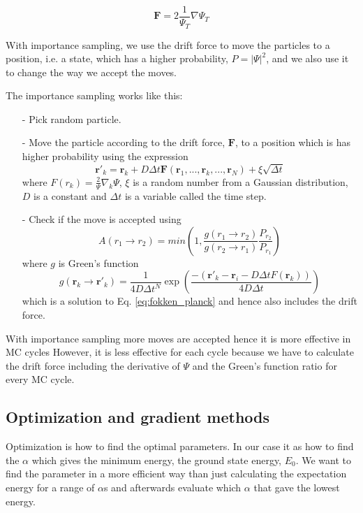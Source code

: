 \begin{equation}\label{eq:drift_force}
\mathbf{F} = 2 \frac{1}{\Psi_T} \nabla\Psi_T
\end{equation}

With importance sampling, we use the drift force to move the particles to a position, i.e. a state, which has a higher probability, $P = |\Psi|^2$, and we also use it to change the way we accept the moves. 

The importance sampling works like this:
\begin{itemize}
\item[-] Pick random particle.
\item[-] Move the particle according to the drift force, $\mathbf{F}$, to a position which is has higher probability using the expression
$$ \mathbf{r}'_k = \mathbf{r}_k + D\Delta t \mathbf{F}(\mathbf{r}_1,...,\mathbf{r}_k,..., \mathbf{r}_N) + \xi \sqrt{\Delta t} $$
where $F(r_k) = \frac{2}{\Psi}\nabla_k\Psi$, $\xi$ is a random number from a Gaussian distribution, $D$ is a constant and $\Delta t$ is a variable called the time step.
\item[-] Check if the move is accepted using
$$ A(r_1\rightarrow r_2) = min\left( 1, \frac{g(r_1\rightarrow r_2)}{g(r_2\rightarrow r_1)}\frac{P_{r_2}}{P_{r_1}}\right)$$
where $g$ is Green's function
$$ g(\mathbf{r}_k \rightarrow \mathbf{r}'_k) = \frac{1}{4 D \Delta t^N}\exp\left( \frac{-(\mathbf{r}'_k - \mathbf{r}_i - D\Delta tF(\mathbf{r}_k))}{4 D \Delta t}\right)$$ which is a solution to Eq. \ref{eq:fokken_planck} and hence also includes the drift force.
\end{itemize}

With importance sampling more moves are accepted hence it is more effective in MC cycles However, it is less effective for each cycle because we have to calculate the drift force including the derivative of $\Psi$ and the Green's function ratio for every MC cycle.

\subsection{Optimization and gradient methods}
Optimization is how to find the optimal parameters. In our case it as how to find the $\alpha$ which gives the minimum energy, the ground state energy, $E_0$. We want to find the parameter in a more efficient way than just calculating the expectation energy for a range of $\alpha$s and afterwards evaluate which $\alpha$ that gave the lowest energy.


